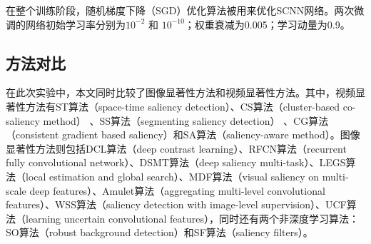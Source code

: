 在整个训练阶段，随机梯度下降（SGD）优化算法被用来优化SCNN网络。两次微调的网络初始学习率分别为$10^{-2}$ 和 $10^{-10}$；权重衰减为0.005；学习动量为0.9。

\subsection{方法对比}

在此次实验中，本文同时比较了图像显著性方法和视频显著性方法。其中，视频显著性方法有ST算法（space-time saliency detection）\cite{zhou2014time}、CS算法（cluster-based co-saliency
method） \cite{fu2013cluster}、SS算法（segmenting saliency detection） \cite{rahtu2010segmenting}、CG算法（consistent gradient based saliency）\cite{wang2015consistent}和SA算法（saliency-aware method）\cite{wang2015saliency}。图像显著性方法则包括DCL算法（deep contrast learning）\cite{li2016deep}、RFCN算法（recurrent fully convolutional network）\cite{wang2016saliency}、DSMT算法（deep saliency multi-task）\cite{li2016deepsaliency}、LEGS算法（local estimation and global search）\cite{wang2015deep}、MDF算法（visual saliency on multi-scale deep features）\cite{li2016visual}、Amulet算法（aggregating multi-level convolutional features）\cite{Zhang_2017_ICCV_Amulet}、WSS算法（saliency detection with image-level supervision）\cite{Wang2017Learning}、UCF算法（learning uncertain convolutional features）\cite{Zhang_2017_ICCV_UCF}，同时还有两个非深度学习算法：SO算法（robust background detection）\cite{zhu2014saliency}和SF算法（saliency filters）\cite{perazzi2012saliency}。

